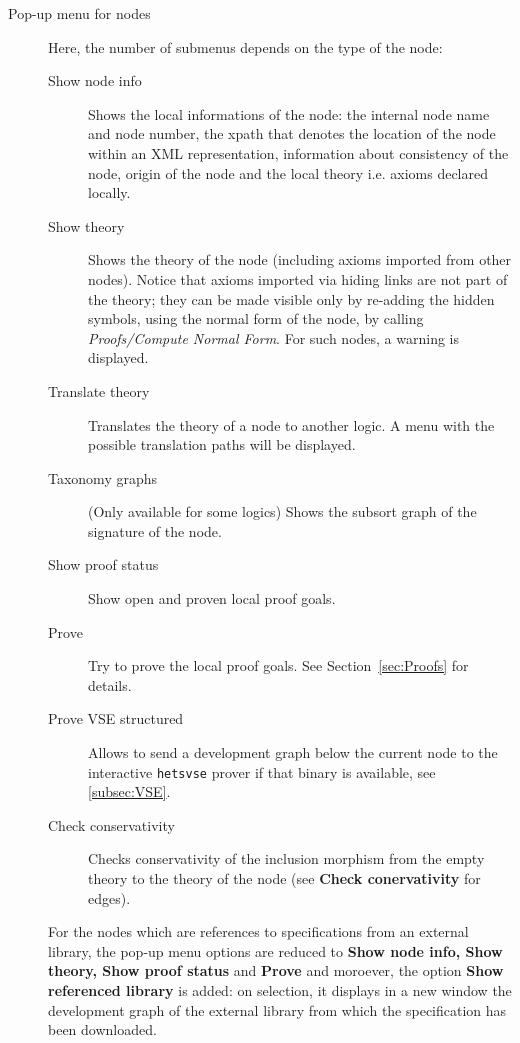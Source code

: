 \documentclass{article}
\begin{document}
\begin{description}
\begin{description}
\end{description}

\item[Pop-up menu for nodes]
Here, the number of submenus depends on the type of the node:
\begin{description}

\item[Show node info] Shows the local informations of the node: the internal
  node name and node number, the xpath that denotes the location of the node
  within an XML representation, information about consistency of the node,
  origin of the node and the local theory i.e. axioms declared locally.

\item[Show theory] Shows the theory of the node (including axioms
imported from other nodes). Notice that axioms imported via hiding  links
are not part of the theory; they can be made visible only by re-adding
the hidden symbols, using the normal form of the node, by calling
\emph{Proofs/Compute Normal Form}. For such nodes, a warning is displayed.

\item[Translate theory] Translates the theory of a node to another logic.
A menu with the possible translation paths will be displayed.

\item[Taxonomy graphs] (Only available for some logics) Shows the subsort graph
 of the signature of the node.

\item[Show proof status] Show open and proven local proof goals.
\item[Prove] Try to prove the local proof goals. See Section~\ref{sec:Proofs}
for details.

\item[Prove VSE structured] Allows to send a development graph below the
  current node to the interactive \texttt{hetsvse} prover if that binary is
  available, see \ref{subsec:VSE}.

\item[Check conservativity] Checks conservativity of the inclusion
 morphism from the empty theory to the theory of the node (see
 {\bf Check conervativity} for edges).
\end{description}

For the nodes which are references to specifications from an external library,
the pop-up menu options are reduced to {\bf Show node info, Show theory,
Show proof status} and {\bf Prove} and moroever, the option {\bf Show
referenced library} is added: on selection, it displays in  a new window
the development graph of the external library from which the specification has
been downloaded.


\end{description}
\end{document}
